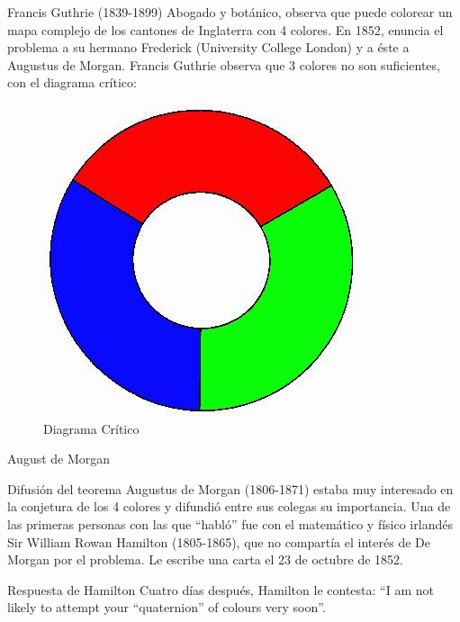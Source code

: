 \documentclass[spanish,utf8]{beamer}
\begin{document}
\begin{frame}{\insertsection}\transblindsvertical
\begin{flushright}
\begin{block}{Francis Guthrie (1839-1899)}
Abogado y botánico, observa que puede colorear un mapa complejo de los cantones de Inglaterra con 4 colores. En 1852, enuncia el problema a su hermano Frederick (University College London) y a éste a Augustus de Morgan. Francis Guthrie observa que 3 colores no son suficientes, con el diagrama crítico:
\end{block}
\begin{figure}
  \includegraphics[scale=0.3]{diagrama.jpg}
    \caption{Diagrama Crítico}
\end{figure}
\end{flushright}
\end{frame}

\begin{frame}{\insertsection}\transblindsvertical
August de Morgan
\begin{block}{Difusión del teorema}
Augustus de Morgan (1806-1871) estaba muy interesado en la conjetura de los 4 colores y difundió entre sus colegas su importancia. Una de las primeras personas con las que ``habló'' fue con el matemático y físico irlandés Sir William Rowan Hamilton (1805-1865), que no compartía el interés de De Morgan por el problema. Le escribe una carta el 23 de octubre de 1852.
\end{block}

\begin{block}{Respuesta de Hamilton}
Cuatro días después, Hamilton le contesta: ``I am not likely to attempt your “quaternion” of colours very soon''.
\end{block}    
\end{frame}
\end{document}
